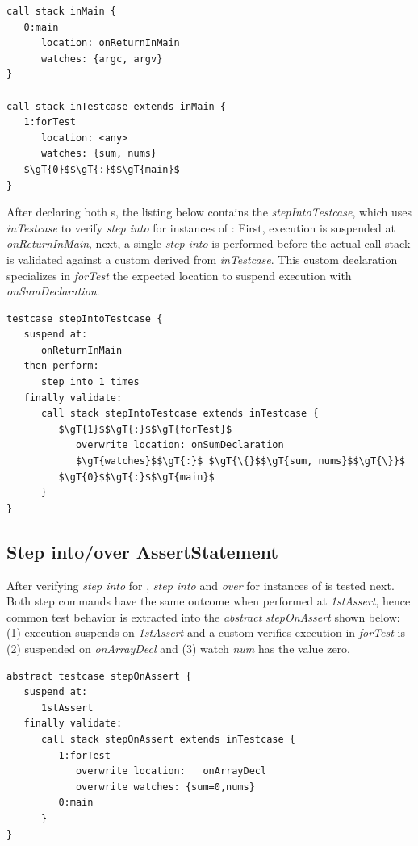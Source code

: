\begin{lstlisting}[language=testingDSL]
call stack inMain {
   0:main
      location: onReturnInMain
      watches: {argc, argv}                     
}
   
call stack inTestcase extends inMain {
   1:forTest
      location: <any>
      watches: {sum, nums}                  
   $\gT{0}$$\gT{:}$$\gT{main}$
}
\end{lstlisting}

After declaring both s, the listing below contains
the  \emph{stepIntoTestcase}, which uses \emph{inTestcase}
to verify \emph{step into} for instances of : First,
execution is suspended at \emph{onReturnInMain}, next, a single \emph{step into}
is performed before the actual call stack is validated against
a custom  derived from \emph{inTestcase}.
This custom declaration specializes in
\emph{forTest} the expected location to suspend execution with
\emph{onSumDeclaration}.

\begin{lstlisting}[language=testingDSL]
testcase stepIntoTestcase {            
   suspend at: 
      onReturnInMain
   then perform:                         
      step into 1 times    
   finally validate:                         
      call stack stepIntoTestcase extends inTestcase {
         $\gT{1}$$\gT{:}$$\gT{forTest}$
            overwrite location: onSumDeclaration
            $\gT{watches}$$\gT{:}$ $\gT{\{}$$\gT{sum, nums}$$\gT{\}}$
         $\gT{0}$$\gT{:}$$\gT{main}$                       
      }
}
\end{lstlisting}

\subsection{Step into/over AssertStatement}

After verifying \emph{step into} for , 
\emph{step into} and \emph{over} for instances of  is tested
next. Both step commands have the same outcome when performed at
\emph{1stAssert}, hence common test behavior is extracted into the
\emph{abstract}  \emph{stepOnAssert} shown below: (1) 
execution suspends on \emph{1stAssert} and a custom  verifies 
execution in \emph{forTest} is (2) suspended on \emph{onArrayDecl} and
(3) watch \emph{num} has the value zero.
 
\begin{lstlisting}[language=testingDSL]
abstract testcase stepOnAssert {
   suspend at: 
      1stAssert
   finally validate:
      call stack stepOnAssert extends inTestcase {
         1:forTest
            overwrite location:   onArrayDecl
            overwrite watches: {sum=0,nums}
         0:main                      
      }
}
\end{lstlisting}

